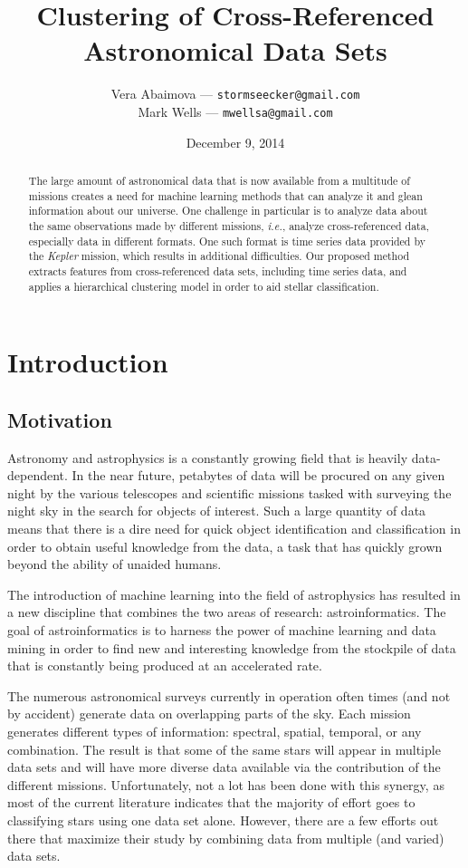 \documentclass[12pt]{article}
\title{
	Clustering of Cross-Referenced Astronomical Data Sets
}
\author{
	Vera Abaimova --- \texttt{stormseecker@gmail.com} \\ 
        Mark Wells --- \texttt{mwellsa@gmail.com}
}
\date{December 9, 2014}
\begin{document}
\maketitle

\begin{abstract}
The large amount of astronomical data that is now available from a multitude of missions creates a need for machine learning methods that can analyze it and glean information about our universe.
One challenge in particular is to analyze data about the same observations made by different missions, \textit{i.e.}, analyze cross-referenced data, especially data in different formats.
One such format is time series data provided by the \textit{Kepler} mission, which results in additional difficulties.
Our proposed method extracts features from cross-referenced data sets, including time series data, and applies a hierarchical clustering model in order to aid stellar classification.

\end{abstract}

\section{Introduction} %
\label{sec:Introduction}

\subsection{Motivation} %
\label{sub:Motivation}
Astronomy and astrophysics is a constantly growing field that is heavily data-dependent. 
In the near future, petabytes of data will be procured on any given night by the various telescopes and scientific missions tasked with surveying the night sky in the search for objects of interest.
Such a large quantity of data means that there is a dire need for quick object identification and classification in order to obtain useful knowledge from the data, a task that has quickly grown beyond the ability of unaided humans.

The introduction of machine learning into the field of astrophysics has resulted in a new discipline that combines the two areas of research: astroinformatics.
The goal of astroinformatics is to harness the power of machine learning and data mining in order to find new and interesting knowledge from the stockpile of data that is constantly being produced at an accelerated rate.

The numerous astronomical surveys currently in operation often times (and not by accident) generate data on overlapping parts of the sky.
Each mission generates different types of information: spectral, spatial, temporal, or any combination.
The result is that some of the same stars will appear in multiple data sets and will have more diverse data available via the contribution of the different missions.
Unfortunately, not a lot has been done with this synergy, as most of the current literature indicates that the majority of effort goes to classifying stars using one data set alone.
However, there are a few efforts out there that maximize their study by combining data from multiple (and varied) data sets.
\end{document}
